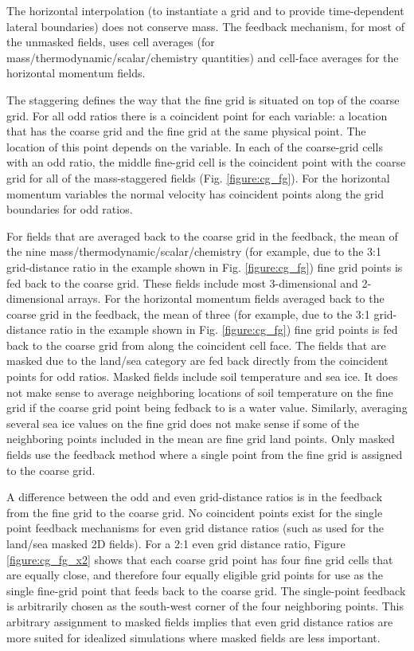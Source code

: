 The horizontal interpolation (to instantiate a grid and to provide 
time-dependent lateral boundaries) does not conserve mass.  The 
feedback mechanism, for most of the unmasked fields, uses cell 
averages (for mass/thermodynamic/scalar/chemistry quantities) and cell-face 
averages for the horizontal momentum fields.


The staggering defines the way that the fine grid is situated 
on top of the coarse grid.  For all odd ratios there is a coincident 
point for each variable: a location that has the coarse grid 
and the fine grid at the same physical point.  The location of 
this point depends on the variable. 
In each of the 
coarse-grid cells with an odd ratio, the middle fine-grid cell
is the coincident point with the coarse grid for all of the 
mass-staggered fields (Fig. \ref{figure:cg_fg}).  
For the horizontal momentum variables
the normal velocity has coincident points along the grid boundaries for odd ratios.

For fields 
that are averaged back to the coarse grid in the feedback, the 
mean of the nine mass/thermodynamic/scalar/chemistry (for example, due to the 3:1 grid-distance ratio
in the example shown in Fig. \ref{figure:cg_fg}) fine grid 
points is fed back to the coarse grid.  These fields include most
3-dimensional and 2-dimensional arrays.  
For the horizontal momentum fields averaged back to the coarse grid in the 
feedback, the mean of three (for example, due to the 3:1 grid-distance ratio
in the example shown in Fig. \ref{figure:cg_fg}) fine grid
points is fed back to the coarse grid from along the coincident cell face.
The fields that are masked due 
to the land/sea category are fed back directly from the coincident points 
for odd ratios.  Masked fields include soil temperature and sea ice.  It does not make 
sense to average neighboring locations of soil temperature on the fine grid 
if the coarse grid point being fedback to is a water value.  Similarly, averaging
several sea ice values on the fine grid does not make sense if some of the neighboring
points included in the mean are fine grid land points. 
Only masked fields use the feedback method where a single
point from the fine grid is assigned to the coarse grid.

A difference between the odd and even grid-distance ratios 
is in the feedback from the fine grid to the coarse grid.  No 
coincident points exist for the single point feedback mechanisms
for even grid distance ratios
(such as used for the land/sea masked 2D fields).  
For a 2:1 even grid distance ratio, Figure
\ref{figure:cg_fg_x2} shows that each coarse 
grid point has four fine grid cells that are equally close,
and therefore four equally eligible grid points for use as the 
single fine-grid point that feeds back to the coarse grid.  The 
single-point feedback is arbitrarily chosen as the south-west 
corner of the four neighboring points.
This arbitrary assignment to masked fields implies that even
grid distance ratios are more suited for idealized simulations
where masked fields are less important.



